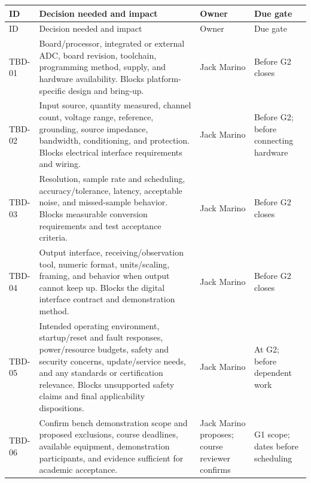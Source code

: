 \small
\begin{tabularx}{\linewidth}{L{1.8cm}Y L{2.7cm}L{2cm}}
\caption{Week 1 TBDs and Decision Owners\label{Table:WeekOneTBDs}}\\
\toprule
ID & Decision needed and impact & Owner & Due gate\\
\midrule
\endfirsthead
\toprule
ID & Decision needed and impact & Owner & Due gate\\
\midrule
\endhead
\bottomrule
\endlastfoot
TBD-01 & Board/processor, integrated or external ADC, board revision,
toolchain, programming method, supply, and hardware availability.
Blocks platform-specific design and bring-up. &
Jack Marino & Before G2 closes\\
TBD-02 & Input source, quantity measured, channel count, voltage range,
reference, grounding, source impedance, bandwidth, conditioning, and
protection. Blocks electrical interface requirements and wiring. &
Jack Marino & Before G2; before connecting hardware\\
TBD-03 & Resolution, sample rate and scheduling, accuracy/tolerance,
latency, acceptable noise, and missed-sample behavior. Blocks measurable
conversion requirements and test acceptance criteria. &
Jack Marino & Before G2 closes\\
TBD-04 & Output interface, receiving/observation tool, numeric format,
units/scaling, framing, and behavior when output cannot keep up.
Blocks the digital interface contract and demonstration method. &
Jack Marino & Before G2 closes\\
TBD-05 & Intended operating environment, startup/reset and fault responses,
power/resource budgets, safety and security concerns, update/service needs,
and any standards or certification relevance. Blocks unsupported safety
claims and final applicability dispositions. &
Jack Marino & At G2; before dependent work\\
TBD-06 & Confirm bench demonstration scope and proposed exclusions,
course deadlines, available equipment, demonstration participants, and
evidence sufficient for academic acceptance. &
Jack Marino proposes; course reviewer confirms & G1 scope; dates before scheduling\\
\end{tabularx}
\normalsize

